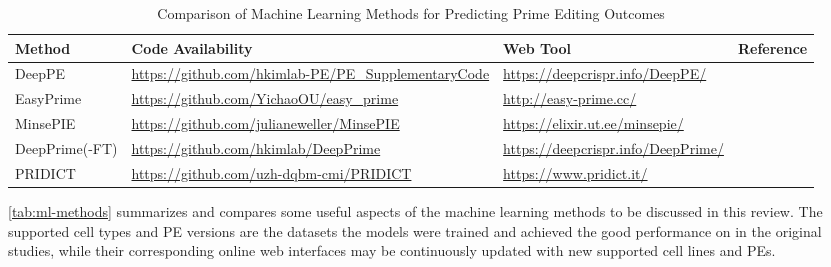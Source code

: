 \documentclass[12pt]{article}
\begin{document}
\begin{table}
\begin{tabularx}{\textwidth}{p{}p{}p{}p{}}
        \textbf{Method}         & \textbf{Code Availability}                                         & \textbf{Web Tool}                                                                                    & \textbf{Reference}                                                                                                                 \\
        \hline
        DeepPE         & \url{https://github.com/hkimlab-PE/PE\_SupplementaryCode} & \url{https://deepcrispr.info/DeepPE/}                                                       & \cite{kimPredictingEfficiencyPrime2021a}                                                                                  \\
        EasyPrime     & \url{https://github.com/YichaoOU/easy\_prime}             & \url{http://easy-prime.cc/}                                                                 & \cite{liEasyPrimeMachineLearning2021}                                                                                     \\
        MinsePIE       & \url{https://github.com/julianeweller/MinsePIE}           & \url{https://elixir.ut.ee/minsepie/}                                                        & \cite{koeppelPredictionPrimeEditing2023}                                                                                  \\
        DeepPrime(-FT)                  & \url{https://github.com/hkimlab/DeepPrime}      & \url{https://deepcrispr.info/DeepPrime/}                                             & \cite{yuPredictionEfficienciesDiverse2023}                                                                                \\
        PRIDICT        & \url{https://github.com/uzh-dqbm-cmi/PRIDICT}             & \url{https://www.pridict.it/} & \cite{mathisPredictingPrimeEditing2023} \\
        \hline
        \end{tabularx}
    \caption{Comparison of Machine Learning Methods for Predicting Prime Editing Outcomes}
    \label{tab:ml-methods}
\end{table}

\autoref{tab:ml-methods} summarizes and compares some useful aspects of the machine learning methods to be discussed in this review. The supported cell types and PE versions are the datasets the models were trained and achieved the good performance on in the original studies, while their corresponding online web interfaces may be continuously updated with new supported cell lines and PEs.
\end{document}
